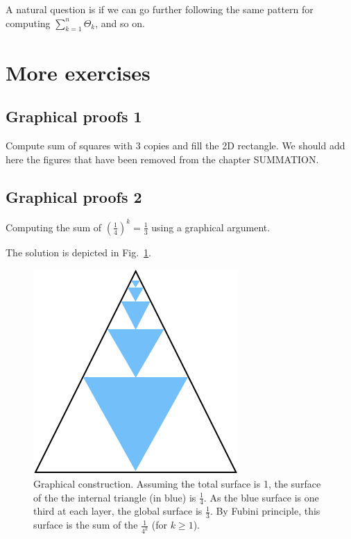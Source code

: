 A natural question is if we can go further following the same pattern for computing $ \sum_{k=1}^{n} \Theta_k$, and so on.

\section{More exercises}

\subsection{Graphical proofs 1}

Compute sum of squares with 3 copies and fill the 2D rectangle. 
We should add here the figures that have been removed from the chapter SUMMATION. 

\subsection{Graphical proofs 2}

Computing the sum of $(\frac{1}{4})^k =\frac{1}{3} $ using a graphical argument.

The solution is depicted in Fig.~\ref{Fig:SUmgeo1sur4}. 


\begin{figure}
\begin{center}
        \includegraphics[scale=0.4]{FiguresArithmetic/SumGeometric1sur4}
        \caption{Graphical construction. Assuming the total surface is 1, the surface of the the internal triangle (in blue) is $\frac{1}{4}$.
        As the blue surface is one third at each layer, the global surface is $\frac{1}{3}$.
        By Fubini principle, this surface is the sum of the $\frac{1}{4^k}$ (for $k \geq 1$).}
        \label{Fig:SUmgeo1sur4}
\end{center}
\end{figure}



